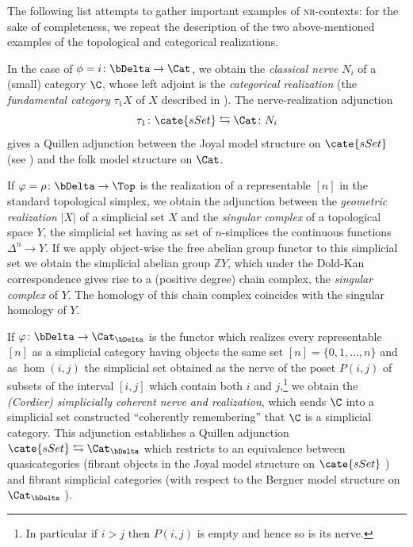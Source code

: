 The following list attempts to gather important examples of \textsc{nr}-contexts: for the sake of completeness, we repeat the description of the two above-mentioned examples of the topological and categorical realizations.
\begin{example}\label{catnerve}
In the case of $\phi = i \colon \bDelta\to \Cat$, we obtain the \emph{classical nerve} $N_i$ of a (small) category $\C$, whose left adjoint is the \emph{categorical realization} (the \emph{fundamental category} $\tau_1 X$ of $X$ described in \cite{joyal2002quasi}). The nerve\hyp{}realization adjunction
\[
\tau_1 \colon \cate{sSet}\leftrightarrows \Cat\colon N_i
\]
gives a Quillen adjunction between the Joyal model structure on $\cate{sSet}$ (see \cite{joyal2002quasi}) and the folk model structure on $\Cat$.
\end{example}
\begin{example}\label{topnerve} 
If $\varphi = \rho \colon\bDelta\to \Top$ is the realization of a representable $[n]$ in the standard topological simplex, we obtain the adjunction between the \emph{geometric realization} $|X|$ of a simplicial set $X$ and the \emph{singular complex} of a topological space $Y$, \ie the simplicial set having as set of $n$-simplices the continuous functions $\Delta^n\to Y$. If we apply object-wise the free abelian group functor to this simplicial set we obtain the simplicial abelian group $\mathbb ZY$, which under the Dold-Kan correspondence  gives rise to a (positive degree) chain complex, the \emph{singular complex} of $Y$. The homology of this chain complex coincides with the singular homology of $Y$.
\end{example}
\begin{example}
If $\varphi\colon \bDelta\to \Cat_{\bDelta}$ is the functor which realizes every representable $[n]$ as a simplicial category having objects the same set $[n]=\{0,1,\dots, n\}$ and as $\hom(i,j)$ 
the simplicial set obtained as the nerve of the poset $P(i,j)$ of subsets of the interval $[i,j]$ which contain both $i$ and $j$,\footnote{In particular if $i > j$ then $P(i,j)$ is empty and hence so is its nerve.} we obtain the \emph{(Cordier) simplicially coherent nerve and realization}, which sends $\C$ into a simplicial set constructed ``coherently remembering'' that $\C$ is a simplicial category. This adjunction establishes a Quillen adjunction $\cate{sSet}\leftrightarrows \Cat_{\bDelta}$ which restricts to an equivalence between quasicategories (fibrant objects in the Joyal model structure on $\cate{sSet}$ \cite{Joy}) and fibrant simplicial categories (with respect to the Bergner model structure on $\Cat_{\bDelta}$ \cite{bergner2007model}).
\end{example}
